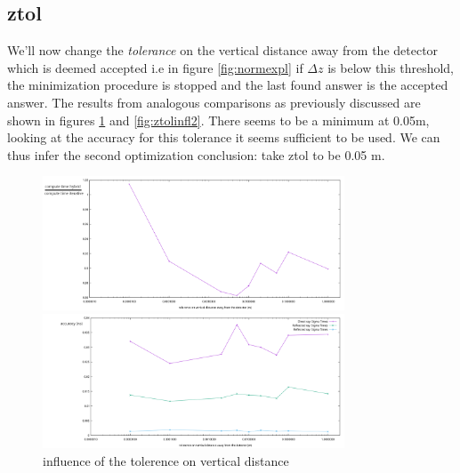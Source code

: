 \documentclass[11pt,a4paper,faculty=we,language=en,doctype=report]{cls/ugent-doc}
\begin{document}
\subsection{ztol}
We'll now change the \textit{tolerance} on the vertical distance away from the
detector which is deemed accepted i.e in figure \ref{fig:normexpl} if $\Delta
z$ is below this threshold, the minimization procedure is stopped and the last
found answer is the accepted answer.  The results from analogous comparisons as
previously discussed are shown in figures \ref{fig:ztolinfl} and
\ref{fig:ztolinfl2}.  There seems to be a minimum at 0.05m, looking at the
accuracy for this tolerance it seems sufficient to be used.  We can thus infer
the second optimization conclusion: take ztol to be 0.05 m.
\begin{figure}
	\centering
	\begin{minipage}{\textwidth}
		\includegraphics[width=0.8\textwidth]{figures/ZtolVsTime2.pdf}
	\end{minipage}
	\begin{minipage}{\textwidth}
		\includegraphics[width=0.8\textwidth]{figures/ZtolVsSigmaTime.pdf}
	\end{minipage}
\caption{influence of the tolerence on vertical distance}
\label{fig:ztolinfl}
\end{figure}
\end{document}
